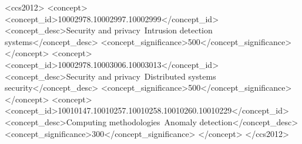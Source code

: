 \documentclass[
    format=sigplan,
    screen,
    natbib=false,
]{acmart}
\theoremstyle{definition}
\theoremstyle{definition}
\begin{document}
    

\glsresetall %

\begin{CCSXML}
<ccs2012>
   <concept>
       <concept_id>10002978.10002997.10002999</concept_id>
       <concept_desc>Security and privacy~Intrusion detection systems</concept_desc>
       <concept_significance>500</concept_significance>
       </concept>
   <concept>
       <concept_id>10002978.10003006.10003013</concept_id>
       <concept_desc>Security and privacy~Distributed systems security</concept_desc>
       <concept_significance>500</concept_significance>
       </concept>
   <concept>
       <concept_id>10010147.10010257.10010258.10010260.10010229</concept_id>
       <concept_desc>Computing methodologies~Anomaly detection</concept_desc>
       <concept_significance>300</concept_significance>
       </concept>
 </ccs2012>
\end{CCSXML}



%
%

\received[revised]{--}
\received[accepted]{--}

\maketitle













\printbibliography
\end{document}
